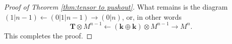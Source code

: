 \documentclass[10pt,a4paper]{amsart}
\begin{document}
\begin{proof}[Proof of Theorem \ref{thm:tensor to pushout}]
    What remains is the diagram $(1|n-1) \leftarrow (0|1|n-1) \rightarrow (0|n)$, or, in other words
    $$\mathbf{T} \otimes M^{n-1} \leftarrow (\mathbf{k} \oplus \mathbf{k}) \otimes M^{n-1} \rightarrow M^n.$$
    This completes the proof.
\end{proof}
\end{document}
